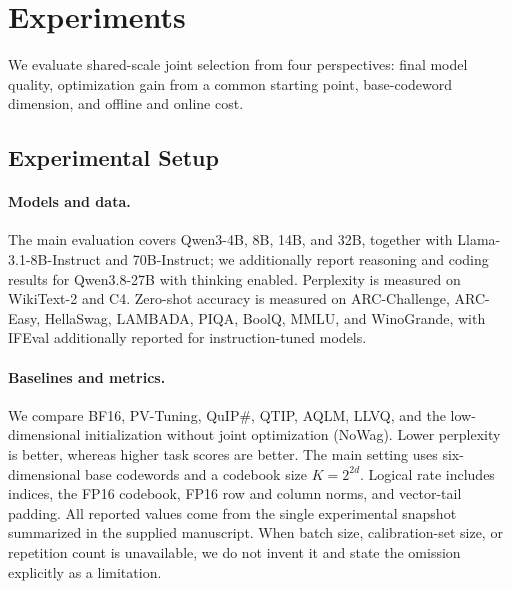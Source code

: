 \section{Experiments}

We evaluate shared-scale joint selection from four perspectives: final model quality, optimization gain from a common starting point, base-codeword dimension, and offline and online cost.

\subsection{Experimental Setup}

\paragraph{Models and data.} The main evaluation covers Qwen3-4B, 8B, 14B, and 32B, together with Llama-3.1-8B-Instruct and 70B-Instruct; we additionally report reasoning and coding results for Qwen3.8-27B with thinking enabled.
Perplexity is measured on WikiText-2 and C4. Zero-shot accuracy is measured on ARC-Challenge, ARC-Easy, HellaSwag, LAMBADA, PIQA, BoolQ, MMLU, and WinoGrande, with IFEval additionally reported for instruction-tuned models.

\paragraph{Baselines and metrics.} We compare BF16, PV-Tuning, QuIP\#, QTIP, AQLM, LLVQ, and the low-dimensional initialization without joint optimization (NoWag). Lower perplexity is better, whereas higher task scores are better.
The main setting uses six-dimensional base codewords and a codebook size $K=2^{2d}$. Logical rate includes indices, the FP16 codebook, FP16 row and column norms, and vector-tail padding.
All reported values come from the single experimental snapshot summarized in the supplied manuscript. When batch size, calibration-set size, or repetition count is unavailable, we do not invent it and state the omission explicitly as a limitation.

